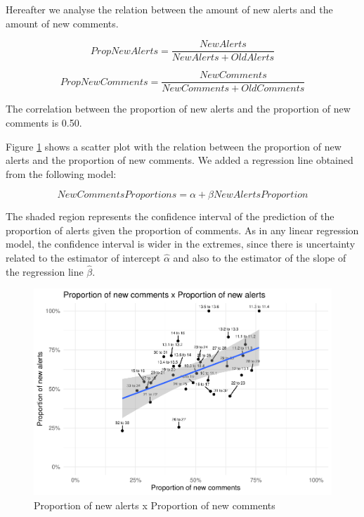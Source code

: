 \documentclass[
]{article}
\begin{document}
Hereafter we analyse the relation between the amount of new alerts and
the amount of new comments.

\[PropNewAlerts = \frac{NewAlerts}{NewAlerts + OldAlerts}\]

\[PropNewComments = \frac{NewComments}{NewComments + OldComments}\]

The correlation between the proportion of new alerts and the proportion
of new comments is 0.50.

Figure \ref{scatter_prop} shows a scatter plot with the relation between
the proportion of new alerts and the proportion of new comments. We
added a regression line obtained from the following model:

\[ NewCommentsProportions = \alpha + \beta NewAlertsProportion \]

The shaded region represents the confidence interval of the prediction
of the proportion of alerts given the proportion of comments. As in any
linear regression model, the confidence interval is wider in the
extremes, since there is uncertainty related to the estimator of
intercept \(\hat{\alpha}\) and also to the estimator of the slope of the
regression line \(\hat{\beta}\).

\small

\begin{figure}
\centering
\includegraphics{report_files/figure-latex/unnamed-chunk-23-1.pdf}
\caption{\label{scatter_prop}Proportion of new alerts x Proportion of
new comments}
\end{figure}

\normalsize

\small

\normalsize
\end{document}
